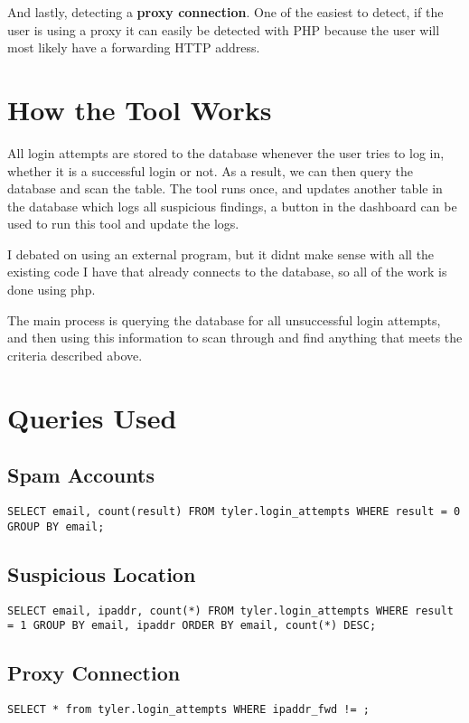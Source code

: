 \documentclass[a4paper, 11pt]{article}
\begin{document}
And lastly, detecting a \textbf{proxy connection}.  One of the easiest to detect, if the user is using a proxy it can easily be detected with PHP because the user will most likely have a forwarding HTTP address.

\section*{How the Tool Works}
All login attempts are stored to the database whenever the user tries to log in, whether it is a successful login or not.  As a result, we can then query the database and scan the table.  The tool runs once, and updates another table in the database which logs all suspicious findings, a button in the dashboard can be used to run this tool and update the logs.

I debated on using an external program, but it didnt make sense with all the existing code I have that already connects to the database, so all of the work is done using php.

The main process is querying the database for all unsuccessful login attempts, and then using this information to scan through and find anything that meets the criteria described above.

\section*{Queries Used}

\subsection*{Spam Accounts}
\begin{lstlisting}
SELECT email, count(result) FROM tyler.login_attempts WHERE result = 0 GROUP BY email;
\end{lstlisting}

\subsection*{Suspicious Location}
\begin{lstlisting}
SELECT email, ipaddr, count(*) FROM tyler.login_attempts WHERE result = 1 GROUP BY email, ipaddr ORDER BY email, count(*) DESC;
\end{lstlisting}

\subsection*{Proxy Connection}
\begin{lstlisting}
SELECT * from tyler.login_attempts WHERE ipaddr_fwd != ;
\end{lstlisting}
\end{document}
